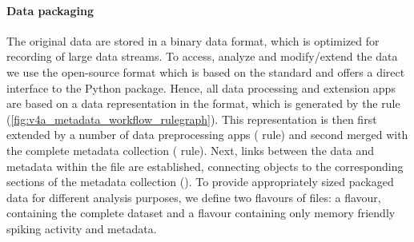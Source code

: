 \paragraph{Data packaging}
The original data are stored in a  binary data format, which is optimized for recording of large data streams. To access, analyze and modify/extend the data we use the open-source  format which is based on the   standard and offers a direct interface to the Python  package. Hence, all data processing and extension apps are based on a data representation in the  format, which is generated by the  rule (\cref{fig:v4a_metadata_workflow_rulegraph}). This representation is then first extended by a number of data preprocessing apps ( rule) and second merged with the complete metadata collection ( rule). Next, links between the data and metadata within the  file are established, connecting  objects to the corresponding sections of the metadata collection (). To provide appropriately sized packaged data for different analysis purposes, we define two flavours of  files: a  flavour, containing the complete dataset and a  flavour containing only memory friendly spiking activity and metadata.

